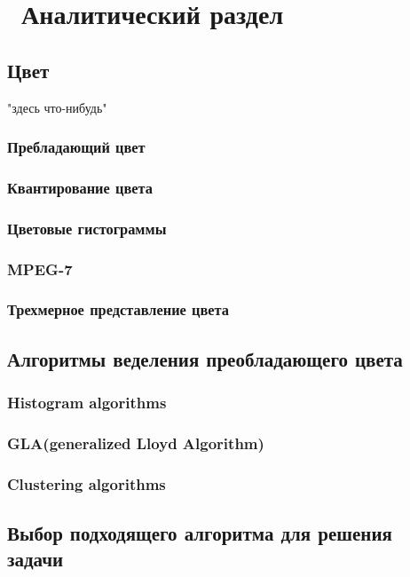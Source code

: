 \chapter{ Аналитический раздел}
\label{cha:analysis}

\section{ Цвет}

"здесь что-нибудь"

\subsection{ Пребладающий цвет}
\subsection{ Квантирование цвета}
\subsection{ Цветовые гистограммы}
\subsection{ MPEG-7}
\subsection{ Трехмерное представление цвета}

\section{ Алгоритмы веделения преобладающего цвета}
\subsection{ Histogram algorithms}
\subsection{ GLA(generalized Lloyd Algorithm)}
\subsection{ Clustering algorithms}

\section{ Выбор подходящего алгоритма для решения задачи}
